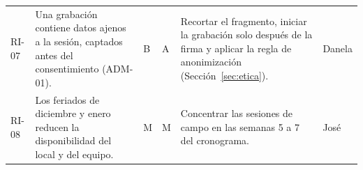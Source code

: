 \begin{longtable}{@{}L{1.0cm}L{4.4cm}L{0.4cm}L{0.4cm}L{5.4cm}L{1.4cm}@{}}
RI-07 & Una grabación contiene datos ajenos a la sesión, captados antes del consentimiento (ADM-01). & B & A & Recortar el fragmento, iniciar la grabación solo después de la firma y aplicar la regla de anonimización (Sección~\ref{sec:etica}). & Danela \\
RI-08 & Los feriados de diciembre y enero reducen la disponibilidad del local y del equipo. & M & M & Concentrar las sesiones de campo en las semanas 5 a 7 del cronograma. & José \\
\end{longtable}
\normalsize
